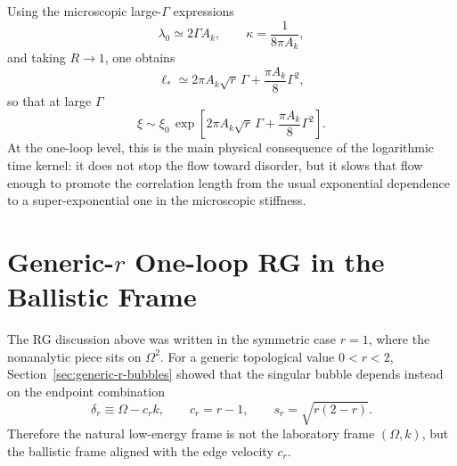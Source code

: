 \documentclass[aps,prx,preprint,amsmath,amssymb]{revtex4-2}
\begin{document}
Using the microscopic large-\(\Gamma\) expressions
\begin{equation}
\lambda_0 \simeq 2\Gamma A_k,
\qquad
\kappa=\frac{1}{8\pi A_k},
\end{equation}
and taking \(R\to 1\), one obtains
\begin{equation}\label{eq:xi-log-micro}
\ell_*
\simeq
2\pi A_k\sqrt{r}\,\Gamma
+\frac{\pi A_k}{8}\Gamma^2,
\end{equation}
so that at large \(\Gamma\)
\begin{equation}
\xi
\sim
\xi_0\,
\exp\!\left[
2\pi A_k\sqrt{r}\,\Gamma
+\frac{\pi A_k}{8}\Gamma^2
\right].
\end{equation}
At the one-loop level, this is the main physical consequence of the logarithmic
time kernel: it does not stop the flow toward disorder, but it slows that flow
enough to promote the correlation length from the usual exponential dependence
to a super-exponential one in the microscopic stiffness.

\section{Generic-\texorpdfstring{$r$}{r} One-loop RG in the Ballistic Frame}
\label{sec:generic-r-rg}

The RG discussion above was written in the symmetric case \(r=1\), where the
nonanalytic piece sits on \(\Omega^2\).  For a generic topological value
\(0<r<2\), Section~\ref{sec:generic-r-bubbles} showed that the singular bubble
depends instead on the endpoint combination
\begin{equation}
\delta_r\equiv \Omega-c_r k,
\qquad
c_r=r-1,
\qquad
s_r=\sqrt{r(2-r)}.
\end{equation}
Therefore the natural low-energy frame is not the laboratory frame
\((\Omega,k)\), but the ballistic frame aligned with the edge velocity \(c_r\).
\end{document}
